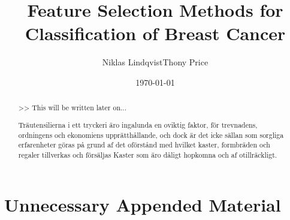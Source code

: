 \documentclass{kththesis}
\title{Feature Selection Methods for Classification of Breast Cancer}
\author{Niklas Lindqvist\newline Thony Price}
\date{\today}
\begin{document}
\frontmatter
\titlepage



\begin{abstract}
  >> This will be written later on...

  \blindtext
\end{abstract}



\begin{otherlanguage}{swedish}
  \begin{abstract}

  Träutensilierna i ett tryckeri äro ingalunda en oviktig faktor,
  för trevnadens, ordningens och ekonomiens upprätthållande, och
  dock är det icke sällan som sorgliga erfarenheter göras på grund
  af det oförstånd med hvilket kaster, formbräden och regaler
  tillverkas och försäljas Kaster som äro dåligt hopkomna och af
  otillräckligt.

  \end{abstract}

\end{otherlanguage}



%
%
%




\tableofcontents
\mainmatter

















\printbibliography[heading=bibintoc] %

\appendix
\chapter{Unnecessary Appended Material}
\end{document}
